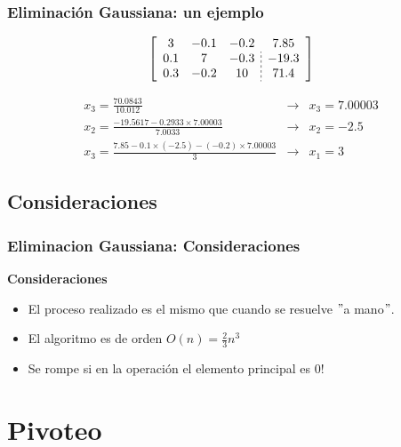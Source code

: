 \documentclass[xcolor=svgnames]{beamer} %
\theoremstyle{plain}
\renewcommand{\textbf}[1]{{\bfseries\textcolor{redUnq2}{#1}}}
\theoremstyle{definition}
\begin{document}
\begin{frame}
\frametitle{Eliminación Gaussiana: un ejemplo}

$$\left[\begin{array}{ccc;{2pt/2pt}c}
 3 & -0.1 & -0.2 & 7.85\\
 0.1 & 7 & -0.3 & -19.3\\
 0.3 & -0.2 & 10 & 71.4
\end{array}\right]$$


$$\begin{array}{ccc}
x_3 = \frac{70.0843}{10.012} &\rightarrow& \boxed{x_3=7.00003}\\
x_2 = \frac{-19.5617-0.2933\times 7.00003}{7.0033} &\rightarrow& \boxed{x_2=-2.5}\\
x_3 = \frac{7.85-0.1\times(-2.5)-(-0.2)\times7.00003}{3} &\rightarrow& \boxed{x_1=3}
\end{array}$$

\end{frame}

\subsection{Consideraciones}
\begin{frame}
\frametitle{Eliminacion Gaussiana: Consideraciones}

\textbf{Consideraciones}
\begin{itemize}
\item El proceso realizado es el mismo que cuando se resuelve $"$a mano$"$.
\pause
\item El algoritmo es de orden  $O(n) = \frac{2}{3} n^3$
\pause
\item Se rompe si en la operación el elemento principal es 0!
\end{itemize}
\end{frame}


\section{Pivoteo}
\end{document}
